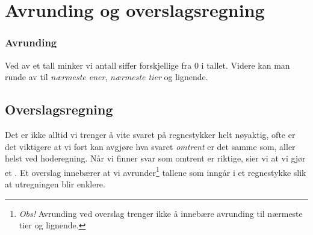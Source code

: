 \section{Avrunding og overslagsregning}

\subsubsection{Avrunding}
Ved  av et tall minker vi antall siffer forskjellige fra 0 i tallet. Videre kan man runde av til \textsl{nærmeste ener}, \textsl{nærmeste tier} og lignende.\regv
{}


\subsection{Overslagsregning}
Det er ikke alltid vi trenger å vite svaret på regnestykker helt nøyaktig, ofte er det viktigere at vi fort kan avgjøre hva svaret \textsl{omtrent} er det samme som, aller helst ved hoderegning. Når vi finner svar som omtrent er riktige, sier vi at vi gjør et . Et overslag innebærer at vi avrunder\footnote{\textit{Obs!} Avrunding ved overslag trenger ikke å innebære avrunding til nærmeste tier og lignende.} tallene som inngår i et regnestykke slik at utregningen blir enklere. \vsk


